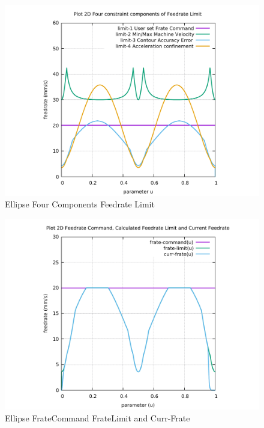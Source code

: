 \begin{figure}
	\caption     {Ellipse Four Components Feedrate Limit}
	\label{10-img-Ellipse-Four-Components-Feedrate-Limit.pdf}
	\includegraphics[width=1.00\textwidth]{Chap4/appendix/app-Ellipse/plots/10-img-Ellipse-Four-Components-Feedrate-Limit.pdf}
\end{figure}

\clearpage
\pagebreak

\begin{figure}
	\caption     {Ellipse FrateCommand FrateLimit and Curr-Frate}
	\label{11-img-Ellipse-FrateCommand-FrateLimit-and-Curr-Frate.pdf}
	\includegraphics[width=1.00\textwidth]{Chap4/appendix/app-Ellipse/plots/11-img-Ellipse-FrateCommand-FrateLimit-and-Curr-Frate.pdf}
\end{figure}

